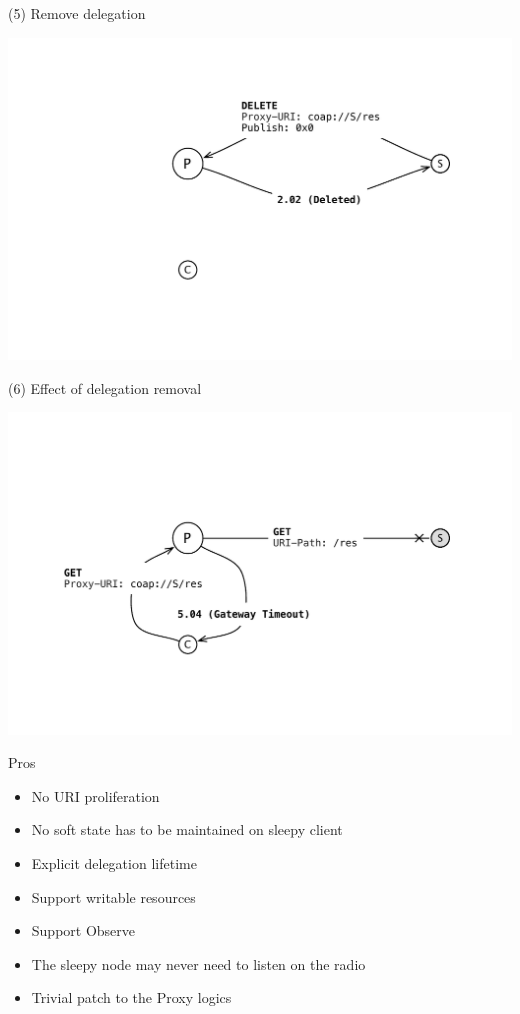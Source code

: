 \documentclass{beamer}
\begin{document}
\begin{frame}{(5) Remove delegation}
 \begin{center}
  \includegraphics[width=\textwidth]{../../share/images/publish4.pdf}
 \end{center}
\end{frame}

\begin{frame}{(6) Effect of delegation removal}
 \begin{center}
  \includegraphics[width=\textwidth]{../../share/images/publish5.pdf}
 \end{center}
\end{frame}

\begin{frame}{Pros}

\begin{itemize}
 \item No URI proliferation %
 \item No soft state has to be maintained on sleepy client
 \item Explicit delegation lifetime
 \item Support writable resources
 \item Support Observe
 \item The sleepy node may never need to listen on the radio
 \item Trivial patch to the Proxy logics 
\end{itemize}
\end{frame}
\end{document}
